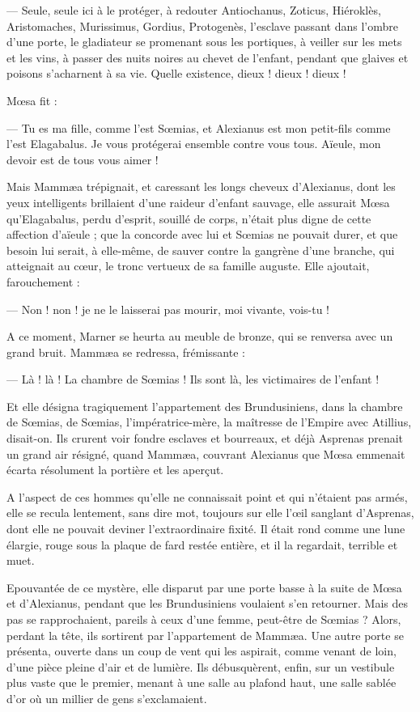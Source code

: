 \documentclass[a4paper, 11pt, oneside, polutonikogreek, french]{article}
\begin{document}
--- Seule, seule ici à le protéger, à redouter Antiochanus, Zoticus, Hiéroklès, Aristomaches, Murissimus, Gordius, Protogenès, l'esclave passant dans l'ombre d'une porte, le gladiateur se promenant sous les portiques, à veiller sur les mets et les vins, à passer des nuits noires au chevet de l'enfant, pendant que glaives et poisons s'acharnent à sa vie. Quelle existence, dieux ! dieux ! dieux !

Mœsa fit :

--- Tu es ma fille, comme l'est Sœmias, et Alexianus est mon petit-fils comme l'est Elagabalus. Je vous protégerai ensemble contre vous tous. Aïeule, mon devoir est de tous vous aimer !

Mais Mammæa trépignait, et caressant les longs cheveux d'Alexianus, dont les yeux intelligents brillaient d'une raideur d'enfant sauvage, elle assurait Mœsa qu'Elagabalus, perdu d'esprit, souillé de corps, n'était plus digne de cette affection d'aïeule ; que la concorde avec lui et Sœmias ne pouvait durer, et que besoin lui serait, à elle-même, de sauver contre la gangrène d'une branche, qui atteignait au cœur, le tronc vertueux de sa famille auguste. Elle ajoutait, farouchement :

--- Non ! non ! je ne le laisserai pas mourir, moi vivante, vois-tu !

A ce moment, Marner se heurta au meuble de bronze, qui se renversa avec un grand bruit. Mammæa se redressa, frémissante :

--- Là ! là ! La chambre de Sœmias ! Ils sont là, les victimaires de l'enfant !

Et elle désigna tragiquement l'appartement des Brundusiniens, dans la chambre de Sœmias, de Sœmias, l'impératrice-mère, la maîtresse de l'Empire avec Atillius, disait-on. Ils crurent voir fondre esclaves et bourreaux, et déjà Asprenas prenait un grand air résigné, quand Mammæa, couvrant Alexianus que Mœsa emmenait écarta résolument la portière et les aperçut.

A l'aspect de ces hommes qu'elle ne connaissait point et qui n'étaient pas armés, elle se recula lentement, sans dire mot, toujours sur elle l'œil sanglant d'Asprenas, dont elle ne pouvait deviner l'extraordinaire fixité. Il était rond comme une lune élargie, rouge sous la plaque de fard restée entière, et il la regardait, terrible et muet.

Epouvantée de ce mystère, elle disparut par une porte basse à la suite de Mœsa et d'Alexianus, pendant que les Brundusiniens voulaient s'en retourner. Mais des pas se rapprochaient, pareils à ceux d'une femme, peut-être de Sœmias ? Alors, perdant la tête, ils sortirent par l'appartement de Mammæa. Une autre porte se présenta, ouverte dans un coup de vent qui les aspirait, comme venant de loin, d'une pièce pleine d'air et de lumière. Ils débusquèrent, enfin, sur un vestibule plus vaste que le premier, menant à une salle au plafond haut, une salle sablée d'or où un millier de gens s'exclamaient.
\clearpage
\end{document}
